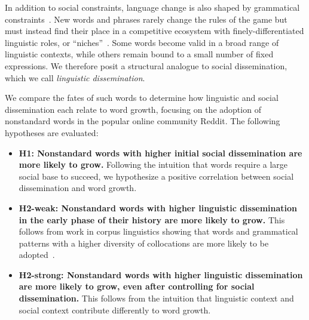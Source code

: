 In addition to social constraints, language change is also shaped by grammatical constraints~\cite{darcy2015}.
New words and phrases rarely change the rules of the game but must instead find their place in a competitive ecosystem with finely-differentiated linguistic roles, or ``niches''~\cite{macwhinney1989}.
Some words become valid in a broad range of linguistic contexts, while others remain bound to a small number of fixed expressions.
We therefore posit a structural analogue to social dissemination, which we call \emph{linguistic dissemination}.

We compare the fates of such words to determine how linguistic and social dissemination each relate to word growth, focusing on the adoption of nonstandard words in the popular online community Reddit.
The following hypotheses are evaluated:
\vspace{-1pt}
\begin{itemize}
  \setlength\itemsep{0pt}
  \setlength\parskip{0pt}
\item \textbf{H1: Nonstandard words with higher initial social dissemination are more likely to grow.} 
Following the intuition that words require a large social base to succeed, we hypothesize a positive correlation between social dissemination and word growth. 
\item \textbf{H2-weak: Nonstandard words with higher linguistic dissemination in the early phase of their history are more likely to grow.} 
This follows from work in corpus linguistics showing that words and grammatical patterns with a higher diversity of collocations are more likely to be adopted~\cite{ito2003,partington1993}.
\item \textbf{H2-strong: Nonstandard words with higher linguistic dissemination are more likely to grow, even after controlling for social dissemination.}
This follows from the intuition that linguistic context and social context contribute differently to word growth. 
\end{itemize}

